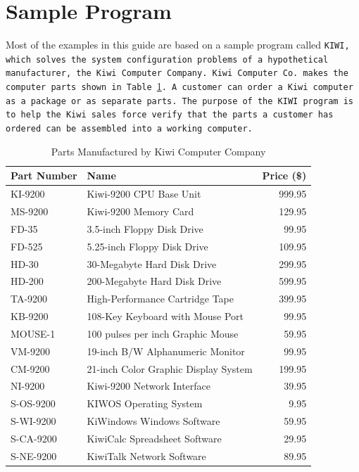 \section{Sample Program}

Most of the examples in this guide are based on a sample program
called \tt{KIWI}, which solves the system configuration problems of a
hypothetical manufacturer, the Kiwi Computer Company. Kiwi Computer
Co. makes the computer parts shown in Table \ref{t:kiwi}. A customer
can order a Kiwi computer as a package or as separate parts. The
purpose of the \tt{KIWI} program is to help the Kiwi sales force
verify that the parts a customer has ordered can be assembled into a
working computer.

\begin{table}[h]
  \begin{tabularx}{\columnwidth}{lXr}
    \toprule
    Part Number &  Name &  Price (\$) \\
    \midrule
    KI-9200   & Kiwi-9200 CPU Base Unit & 999.95 \\
    MS-9200   & Kiwi-9200 Memory Card   & 129.95 \\
    FD-35     & 3.5-inch Floppy Disk Drive &  99.95 \\
    FD-525    & 5.25-inch Floppy Disk Drive & 109.95 \\
    HD-30     & 30-Megabyte Hard Disk Drive & 299.95 \\
    HD-200    & 200-Megabyte Hard Disk Drive & 599.95 \\
    TA-9200   & High-Performance Cartridge Tape & 399.95 \\
    KB-9200   & 108-Key Keyboard with Mouse Port &  99.95 \\
    MOUSE-1   & 100 pulses per inch Graphic Mouse & 59.95 \\
    VM-9200   & 19-inch B/W Alphanumeric Monitor &  99.95 \\
    CM-9200   & 21-inch Color Graphic Display System & 199.95 \\
    NI-9200   & Kiwi-9200 Network Interface &  39.95 \\
    S-OS-9200 & KIWOS Operating System & 9.95 \\
    S-WI-9200 & KiWindows Windows Software &  59.95 \\
    S-CA-9200 & KiwiCalc Spreadsheet Software  &  29.95 \\
    S-NE-9200 & KiwiTalk Network Software &  89.95 \\
    \bottomrule
  \end{tabularx}
  \caption{Parts Manufactured by Kiwi Computer Company}
  \label{t:kiwi}
\end{table}


